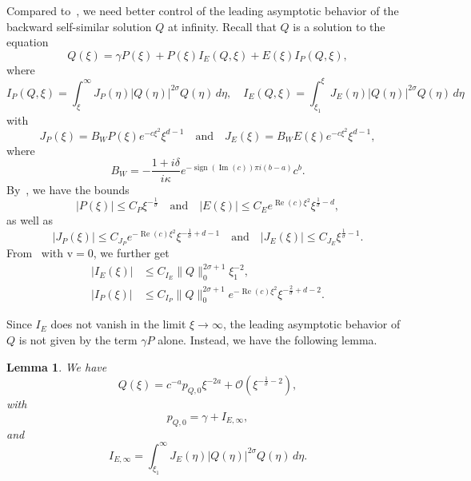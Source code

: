 \documentclass[11pt]{article}
\DeclareMathOperator{\real}{Re}
\DeclareMathOperator{\imag}{Im}
\DeclareMathOperator{\sign}{sign}
\newcommand{\normv}{\mathrm{v}}
\newtheorem{lemma}[definition]{Lemma}
\begin{document}
Compared to~\cite{Dahne2024}, we need better control of the leading
asymptotic behavior of the backward self-similar solution \(Q\) at
infinity. Recall that \(Q\) is a solution to the equation
\begin{equation*}
  Q(\xi) = \gamma P(\xi) + P(\xi)I_{E}(Q, \xi) + E(\xi)I_{P}(Q, \xi),
\end{equation*}
where
\begin{equation*}
  I_{P}(Q, \xi) = \int_{\xi}^{\infty} J_{P}(\eta)|Q(\eta)|^{2\sigma}Q(\eta)\,d\eta,\quad
  I_{E}(Q, \xi) = \int_{\xi_{1}}^{\xi} J_{E}(\eta)|Q(\eta)|^{2\sigma}Q(\eta)\,d\eta
\end{equation*}
with
\begin{equation*}
  J_{P}(\xi) = B_{W}P(\xi)e^{-c\xi^{2}}\xi^{d - 1}
  \quad\text{and}\quad
  J_{E}(\xi) = B_{W}E(\xi)e^{-c\xi^{2}}\xi^{d - 1},
\end{equation*}
where
\begin{equation*}
  B_{W} = -\frac{1 + i\delta}{i\kappa}e^{-\sign(\imag(c))\pi i(b - a)}c^{b}.
\end{equation*}
By~\cite[Lemma~7.3]{Dahne2024}, we have the bounds
\begin{equation*}
  |P(\xi)| \leq C_{P}\xi^{-\frac{1}{\sigma}}
  \quad\text{and}\quad
  |E(\xi)| \leq C_{E}e^{\real(c)\xi^{2}}\xi^{\frac{1}{\sigma} - d},
\end{equation*}
as well as
\begin{equation*}
  |J_{P}(\xi)| \leq C_{J_{P}}e^{-\real(c)\xi^{2}}\xi^{-\frac{1}{\sigma} + d - 1}
  \quad\text{and}\quad
  |J_{E}(\xi)| \leq C_{J_{E}}\xi^{\frac{1}{\sigma} - 1}.
\end{equation*}
From~\cite[Lemma~7.4]{Dahne2024} with \(\normv = 0\), we further get
\begin{align*}
  |I_{E}(\xi)| &\leq C_{I_{E}}\|Q\|_{0}^{2\sigma + 1}\xi_{1}^{-2},\\
  |I_{P}(\xi)| &\leq C_{I_{P}}\|Q\|_{0}^{2\sigma + 1}e^{-\real(c)\xi^{2}}\xi^{-\frac{2}{\sigma} + d - 2}.
\end{align*}

Since \(I_{E}\) does not vanish in the limit \(\xi \to \infty\), the
leading asymptotic behavior of \(Q\) is not given by the term
\(\gamma P\) alone. Instead, we have the following lemma.

\begin{lemma}\label{lemma:p_Q_0}
  We have
  \begin{equation*}
    Q(\xi) = c^{-a}p_{Q,0}\xi^{-2a} + \mathcal{O}(\xi^{-\frac{1}{\sigma} - 2}),
  \end{equation*}
  with
  \begin{equation*}
    p_{Q,0} = \gamma + I_{E,\infty},
  \end{equation*}
  and
  \begin{equation*}
    I_{E,\infty} = \int_{\xi_{1}}^{\infty} J_{E}(\eta)|Q(\eta)|^{2\sigma}Q(\eta)\,d\eta.
  \end{equation*}
\end{lemma}
\end{document}
